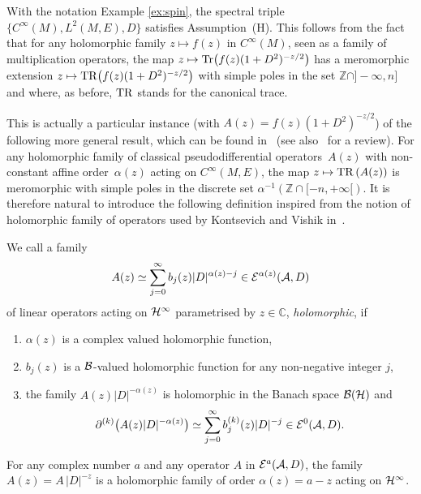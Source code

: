 \documentclass[pdftex]{sigma}
\def \C{\mathbb C}
\def \Z {\mathbb Z}
\def \Ci {{C^\infty}}
\numberwithin{equation}{section}
\begin{document}
\begin{example}
  With the notation Example \ref{ex:spin}, the spectral triple $\{\Ci(M), L^2(M, E), D\}$ sa\-tisf\/ies Assumption~(H). This follows from
  the fact that for any
  holomorphic family $z\mapsto f(z)$ in $\Ci(M)$, seen as a family of
  multiplication operators, the map $z\mapsto {\rm Tr}\big(f(z)   (1+
    D^2 )^{-z/2}\big)$ has a meromorphic extension  $z\mapsto {\rm TR}\big(f(z)   (1+
    D^2 )^{-z/2}\big)$ with simple poles in the set $ \Z\cap
]{-}\infty,n]$ and where, as before, ${\rm  TR}$ stands for the canonical
trace.
\end{example} This is actually a particular instance (with  $A(z)= f(z)   ( 1+
    D^2 )^{-z/2}$) of the following  more general result,
which can be found in~\cite{KV} (see also~\cite{Pa1} for a review). For any holomorphic family of classical pseudodif\/ferential
operators~$A(z)$ with non-constant af\/f\/ine order~$\alpha(z)$ acting on
$\Ci(M,E)$, the map  $z\mapsto {\rm TR}\left(A(z)\right)$ is meromorphic with
simple poles in the discrete set $\alpha^{-1}\left( \Z\cap   [{-}n, +\infty[\right)$. It is therefore natural to introduce
the following def\/inition  inspired from the notion of holomorphic family of
operators used by Kontsevich and Vishik in~\cite{KV}.

\begin{definition} \label{defn:holfamily}   We  call  a family
\begin{gather*}%
A(z)\simeq \sum_{j=0}^\infty b_j(z) \vert D\vert^{\alpha(z)-j}  \in {\cal E}^{\alpha(z)}({\cal A}, D)
\end{gather*}  of
linear  operators acting on ${\cal H}^\infty$  parametrised by $z\in \C$,
 {\it holomorphic}, if
\begin{enumerate}
\itemsep=0pt
\item[1)]    $\alpha(z)$  is a  complex valued  holomorphic function,
\item[2)]    $b_j(z)$  is a ${\cal B}$-valued holomorphic function for any  non-negative integer $j$,
\item[3)] the family $A(z)\vert D\vert^{-\alpha(z)}$ is holomorphic in the Banach space ${\cal B}({\cal H})$ and
\[
\partial^{(k)}\big(A(z)\vert D\vert^{-\alpha(z)}\big)\simeq  \sum_{j=0}^\infty b_j^{(k)}(z) \vert D\vert^{-j}  \in {\cal E}^{0}({\cal A}, D).
\]
\end{enumerate}
\end{definition}

\begin{example}\label{ex:1} For any complex number $a$ and any operator  $A$ in ${\cal E}^a({\cal A},D)$, the family $A(z)= A\, \vert D\vert^{-z}$ is   a holomorphic family of order
  $\alpha(z)=a-z$ acting on ${\cal H}^\infty$.
\end{example}
\end{document}
